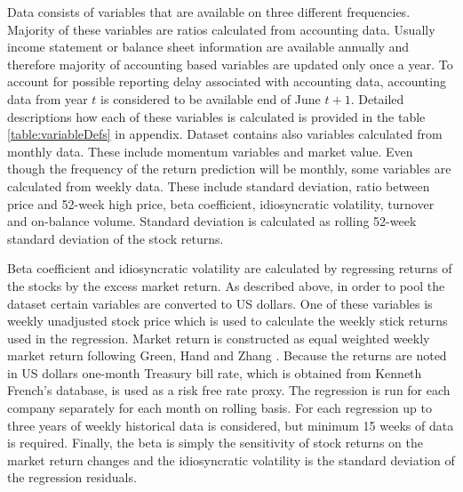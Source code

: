 \documentclass{article}
\begin{document}
Data consists of variables that are available on three different frequencies. Majority of these variables are ratios calculated from accounting data. 
Usually income statement or balance sheet information are available annually and therefore majority of accounting based variables are updated only once a year. To account for possible reporting delay associated with accounting data, accounting data from year $t$ is considered to be available end of June $t+1$. Detailed descriptions how each of these variables is calculated is provided in the table \ref{table:variableDefs} in appendix. Dataset contains also variables calculated from monthly data. These include momentum variables and market value. Even though the frequency of the return prediction will be monthly, some variables are calculated from weekly data. These include standard deviation, ratio between price and 52-week high price, beta coefficient, idiosyncratic volatility, turnover and on-balance volume. Standard deviation is calculated as rolling 52-week standard deviation of the stock returns. 

Beta coefficient and idiosyncratic volatility are calculated by regressing returns of the stocks by the excess market return. As described above, in order to pool the dataset certain variables are converted to US dollars. One of these variables is weekly unadjusted stock price which is used to calculate the weekly stick returns used in the regression. Market return is constructed as equal weighted weekly market return following Green, Hand and Zhang \citeyear{Green2017}. Because the returns are noted in US dollars one-month Treasury bill rate, which is obtained from Kenneth French's database, is used as a risk free rate proxy. The regression is run for each company separately for each month on rolling basis. For each regression up to three years of weekly historical data is considered, but minimum 15 weeks of data is required. Finally, the beta is simply the sensitivity of stock returns on the market return changes and the idiosyncratic volatility is the standard deviation of the regression residuals.
\end{document}

